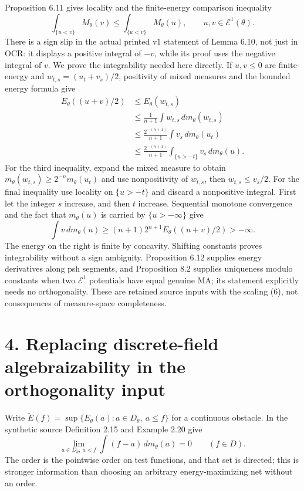 \documentclass[11pt]{article}
\begin{document}
Proposition 6.11 gives locality and the finite-energy comparison inequality
\[
 \int_{\{u<v\}}M_\theta(v)\leq
 \int_{\{u<v\}}M_\theta(u),\qquad u,v\in\mathcal E^1(\theta).
 \tag{7}
\]
There is a sign slip in the actual printed v1 statement of Lemma 6.10, not just in OCR: it displays a positive integral of \(-v\), while its proof uses the negative integral of \(v\). We prove the integrability needed here directly. If \(u,v\leq0\) are finite-energy and \(w_{t,s}=(u_t+v_s)/2\), positivity of mixed measures and the bounded energy formula give
\[
 \begin{aligned}
 E_\theta((u+v)/2)&\leq E_\theta(w_{t,s})\\
 &\leq\frac1{n+1}\int w_{t,s}\,dm_\theta(w_{t,s})\\
 &\leq\frac{2^{-(n+1)}}{n+1}\int v_s\,dm_\theta(u_t)\\
 &\leq\frac{2^{-(n+1)}}{n+1}\int_{\{u>-t\}}v_s\,dm_\theta(u).
 \end{aligned}
 \tag{7a}
\]
For the third inequality, expand the mixed measure to obtain \(m_\theta(w_{t,s})\geq2^{-n}m_\theta(u_t)\) and use nonpositivity of \(w_{t,s}\), then \(w_{t,s}\leq v_s/2\). For the final inequality use locality on \(\{u>-t\}\) and discard a nonpositive integral. First let the integer \(s\) increase, and then \(t\) increase. Sequential monotone convergence and the fact that \(m_\theta(u)\) is carried by \(\{u>-\infty\}\) give
\[
 \int v\,dm_\theta(u)\geq (n+1)2^{n+1}E_\theta((u+v)/2)>-\infty.
 \tag{7b}
\]
The energy on the right is finite by concavity. Shifting constants proves integrability without a sign ambiguity. Proposition 6.12 supplies energy derivatives along psh segments, and Proposition 8.2 supplies uniqueness modulo constants when two \(\mathcal E^1\) potentials have equal genuine MA; its statement explicitly needs no orthogonality. These are retained source inputs with the scaling (6), not consequences of measure-space completeness.

\section*{4. Replacing discrete-field algebraizability in the orthogonality input}

Write \(\widetilde E(f)=\sup\{E_\theta(a):a\in D_\theta,\ a\leq f\}\) for a continuous obstacle. In the synthetic source Definition 2.15 and Example 2.20 give
\[
 \lim_{a\in D_\theta,\ a<f}\int(f-a)\,dm_\theta(a)=0
 \qquad(f\in D).
 \tag{8}
\]
The order is the pointwise order on test functions, and that set is directed; this is stronger information than choosing an arbitrary energy-maximizing net without an order.
\end{document}
